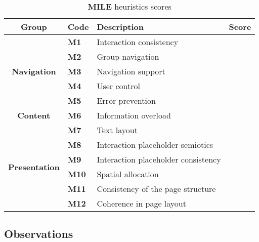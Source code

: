 \begin{table}[htp!]
    \centering
    \begin{tabular}{ |c|l|l|c| }
        \hline
        \textbf{Group} & \textbf{Code} & \textbf{Description} & \textbf{Score}\\
        \hline
        \multirow{5}{*}{\textbf{Navigation}} & \textbf{M1} & Interaction consistency & \textbf{\color{unicefRed}{2}}\\
        \cline{2-4}
        & \textbf{M2} & Group navigation & \textbf{\color{unicefGreen}{4}}\\
        \cline{2-4}
        & \textbf{M3} & Navigation support & \textbf{\color{unicefGreen}{4}}\\
        \cline{2-4}
        & \textbf{M4} & User control & \textbf{\color{unicefOrange}{3}}\\
        \cline{2-4}
        & \textbf{M5} & Error prevention & \textbf{\color{unicefGreen}{4}}\\
        \hline
        \textbf{Content} & \textbf{M6} & Information overload & \textbf{\color{unicefOrange}{3}}\\
        \hline
        \multirow{6}{*}{\textbf{Presentation}} & \textbf{M7} & Text layout & \textbf{\color{unicefGreen}{5}}\\
        \cline{2-4}
        & \textbf{M8} & Interaction placeholder semiotics & \textbf{\color{unicefGreen}{4}}\\
        \cline{2-4}
        & \textbf{M9} & Interaction placeholder consistency & \textbf{\color{unicefGreen}{4}}\\
        \cline{2-4}
        & \textbf{M10} & Spatial allocation & \textbf{\color{unicefOrange}{3}}\\
        \cline{2-4}
        & \textbf{M11} & Consistency of the page structure & \textbf{\color{unicefGreen}{4}}\\
        \cline{2-4}
        & \textbf{M12} & Coherence in page layout & \textbf{\color{unicefGreen}{5}}\\
        \hline
    \end{tabular}
    \caption{\textbf{MILE} heuristics scores}
\end{table}
\newpage
\subsection*{Observations}